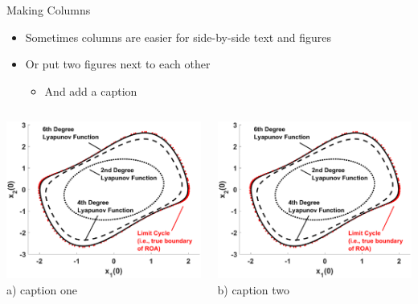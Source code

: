 \begin{frame}[fragile,t]{Making Columns}
	\begin{itemize}
		\item Sometimes columns are easier for side-by-side text and figures
\vspace{0.2in}
		\item Or put two figures next to each other
		\begin{itemize}
			\item And add a caption
		\end{itemize}
	\end{itemize}
\vspace{0.2in}
	\begin{columns}
		\begin{column}{0.49\textwidth}
		\centering
		\includegraphics[width=0.9\columnwidth]{figures/my_figure.eps} 
		\\ a) caption one
		\end{column}
		\begin{column}{0.49\textwidth}
		\centering
		\includegraphics[width=0.9\columnwidth]{figures/my_figure.eps} 
		\\ b) caption two
		\end{column}
	\end{columns}
\end{frame}


